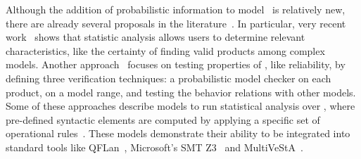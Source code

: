 %		
%				
%				
%		
%	
%	
%
%
Although the addition of probabilistic information to model \SPLs\ is relatively new, there are already several proposals in the literature~\cite{chssgl13,tllv15,tlll15,dpcslsh17}. In particular, very recent 
work~\cite{dpcslsh17} shows that statistic analysis allows users to determine relevant characteristics, like the certainty of finding valid products among complex models.
%
Another approach~\cite{chssgl13} focuses on testing properties of \SPLs, like reliability, by defining three verification techniques: a probabilistic model checker on each product, on a model range, and testing the behavior relations with other models.
%
Some of these approaches describe models to run statistical analysis over \SPLs, where pre-defined syntactic elements are computed by applying a specific set of operational rules~\cite{tllv15,tlll15}. These models demonstrate their ability to be integrated into standard tools like QFLan~\cite{tlll15}, Microsoft's SMT Z3~\cite{ln08} and MultiVeStA~\cite{sa13}.
